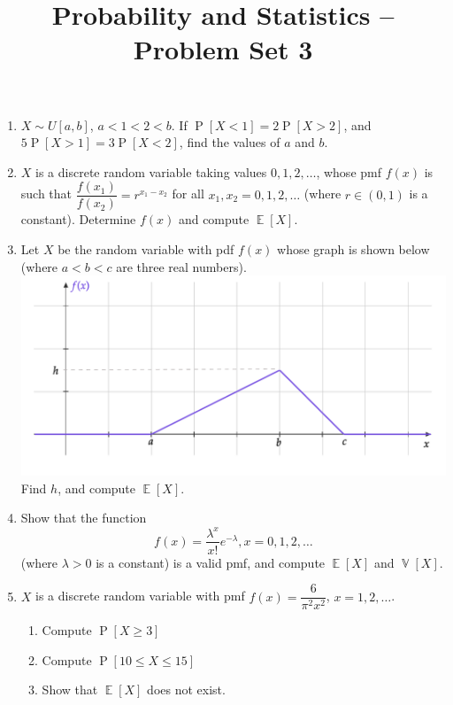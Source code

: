 \documentclass[svgnames]{amsart}
\title[]{Probability and Statistics -- Problem Set 3}
\DeclareMathOperator{\Prob}{P}
\DeclareMathOperator{\EV}{\mathbb E}
\DeclareMathOperator{\Var}{\mathbb V}
\begin{document}
\maketitle
\begin{enumerate}[leftmargin=*]
\item $X \sim U[a,b]$, $a < 1 < 2 < b$. If $\Prob[X < 1] = 2\Prob[X > 2]$, and $5\Prob[X > 1] = 3\Prob[X < 2]$, find the values of $a$ and $b$.

\item $X$ is a discrete random variable taking values $0, 1, 2, \ldots$, whose pmf $f(x)$ is such that $\dfrac{f(x_1)}{f(x_2)} = r^{x_1 - x_2}$ for all $x_1, x_2 = 0, 1, 2, \ldots$ (where $r \in (0, 1)$ is a constant). Determine $f(x)$ and compute $\EV[X]$.

\item Let $X$ be the random variable with pdf $f(x)$ whose graph is shown below (where $a < b < c$ are three real numbers).\\
\includegraphics[scale=0.6]{Set3Graph.pdf}\\
Find $h$, and compute $\EV[X]$.

\item Show that the function
\begin{equation*}
f(x) = \dfrac{\lambda^x}{x!}e^{-\lambda}, x = 0, 1, 2, \ldots
\end{equation*}
(where $\lambda > 0$ is a constant) is a valid pmf, and compute $\EV[X]$ and $\Var[X]$.

\item $X$ is a discrete random variable with pmf $f(x) = \dfrac{6}{\pi^2 x^2}$, $x = 1, 2, \ldots$.
\begin{enumerate}
	\item Compute $\Prob[X \ge 3]$
	\item Compute $\Prob[10 \le X \le 15]$
	\item Show that $\EV[X]$ does not exist.
\end{enumerate}


\end{enumerate}
\end{document}
